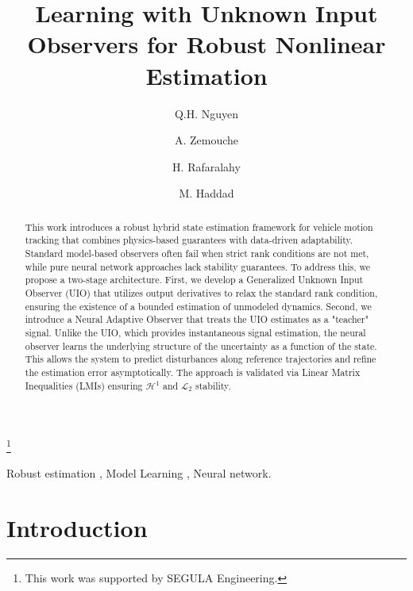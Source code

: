 \documentclass{ifacconf}
\begin{document}
\begin{frontmatter}

\title{Learning with Unknown Input Observers for Robust Nonlinear Estimation}  

\thanks[footnoteinfo]{This work was supported by SEGULA Engineering.}

\author[First]{Q.H. Nguyen} 
\author[First]{A. Zemouche}
\author[First]{H. Rafaralahy}
\author[Second]{M. Haddad}

\address[First]{Universit\'e de Lorraine, CNRS, CRAN, F-57000 Metz (e-mail: quang-huy.nguyen@univ-lorraine.fr).}
\address[Second]{SEGULA Engineering, 19 rue d'Arras, 92000 Nanterre, France (e-mail: madjid.haddad@segula.fr)}

\begin{abstract}                %
This work introduces a robust hybrid state estimation framework for vehicle motion tracking that combines physics-based guarantees with data-driven adaptability. Standard model-based observers often fail when strict rank conditions are not met, while pure neural network approaches lack stability guarantees. To address this, we propose a two-stage architecture. First, we develop a Generalized Unknown Input Observer (UIO) that utilizes output derivatives to relax the standard rank condition, ensuring the existence of a bounded estimation of unmodeled dynamics. Second, we introduce a Neural Adaptive Observer that treats the UIO estimates as a "teacher" signal. Unlike the UIO, which provides instantaneous signal estimation, the neural observer learns the underlying structure of the uncertainty as a function of the state. This allows the system to predict disturbances along reference trajectories and refine the estimation error asymptotically. The approach is validated via Linear Matrix Inequalities (LMIs) ensuring $\mathcal{H}^{1}$ and $\mathcal{L}_{2}$ stability.
\end{abstract}

\begin{keyword}
Robust estimation , Model Learning , Neural network.
\end{keyword}

\end{frontmatter}




\section{Introduction}\label{sec_introduction}
\end{document}
